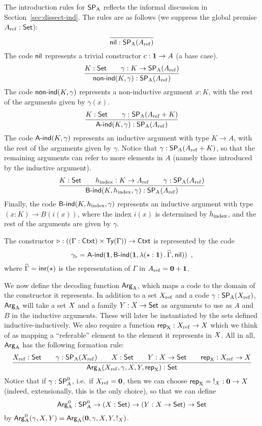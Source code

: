 \documentclass{article}
\begin{document}
The introduction rules for $\mathsf{SP}_{\mathrm{A}}$ reflects the informal discussion in
Section~\ref{sec:dissect-ind}. The rules are as follows (we suppress
the global premise $A_{\mathrm{ref}} : \mathsf{Set}$):
\[
\infer{\nilA : \SPA(\Aref)}{}
\]
%
The code $\mathsf{nil}$ represents a trivial constructor $c : \mathbf{1} \to A$ (a base case).
%
\[
\infer{\nonindA(K, \gamma) : \SPA(\Aref)}{K : \Set & \quad \gamma : K \to \SPA(\Aref)}
\]
%
The code $\mathsf{non}\text{-}\mathsf{ind}(K, \gamma)$ represents a non-inductive argument $x
: K$, with the rest of the arguments given by $\gamma(x)$.
%
\[
\infer{\AindA(K, \gamma) : \SPA(\Aref)}{K : \Set & \quad \gamma : \SPA(\Aref + K)}
\]
%
The code $\mathsf{A}\text{-}\mathsf{ind}(K, \gamma)$ represents an inductive argument with
type $K \to A$, with the rest of the arguments given by
$\gamma$. Notice that $\gamma : \mathsf{SP}_{\mathrm{A}}(A_{\mathrm{ref}} + K)$, so that the
remaining arguments can refer to more elements in $A$ (namely those
introduced by the inductive argument).
%
\[
\infer{\BindA(K, \hindex, \gamma) : \SPA(\Aref)}{K : \Set & \quad \hindex : K \to \Aref & \quad \gamma : \SPA(\Aref)}
\]
%
Finally, the code $\mathsf{B}\text{-}\mathsf{ind}(K, h_{\mathrm{index}}, \gamma)$ represents an inductive
argument with type $(x : K) \to B(i(x))$, where the index $i(x)$ is
determined by $h_{\mathrm{index}}$, and the rest of the arguments are given by
$\gamma$.
%

\begin{example}
  The constructor $\triangleright : ((\Gamma : \mathsf{Ctxt}) \times \mathsf{Ty}(\Gamma))
  \to \mathsf{Ctxt}$ is represented by the code
\[
\gamma_{\triangleright} = \mathsf{A}\text{-}\mathsf{ind}(\mathbf{1}, \mathsf{B}\text{-}\mathsf{ind}(\mathbf{1}, \lambda (\star : \mathbf{1})\,.\,\widehat{\Gamma}, \mathsf{nil})) \enspace ,
\]
where $\widehat{\Gamma} = \mathsf{inr}(\star)$ is the representation of $\Gamma$ in $A_{\mathrm{ref}} = \mathbf{0} + \mathbf{1}$.
\blackqed
\end{example}

We now define the decoding function $\mathsf{Arg}_{\mathrm{A}}$, which maps a code to the
domain of the constructor it represents. In addition to a set $X_{\mathrm{ref}}$
and a code $\gamma : \mathsf{SP}_{\mathrm{A}}(X_{\mathrm{ref}})$, $\mathsf{Arg}_{\mathrm{A}}$ will take a set $X$ and a
family $Y : X \to \mathsf{Set}$ as arguments to use as $A$ and $B$ in the
inductive arguments. These will later be instantiated by the sets
defined inductive-inductively. We also require a function $\mathsf{rep}_{\mathrm{X}} :
X_{\mathrm{ref}} \to X$ which we think of as mapping a ``referable'' element to
the element it represents in $X$. All in all, $\mathsf{Arg}_{\mathrm{A}}$ has the
following formation rule:
%
\[
\infer{\ArgA(\Xref, \gamma, \A, \B, \repA) : \Set}{\Xref : \Set
                                         & \quad \gamma : \SPA(\Xref)
                                         & \quad \A : \Set
                                         & \quad \B : \A \to \Set
                                         & \quad \repA : \Xref \to \A}
\]
%
Notice that if $\gamma : \mathsf{SP}^{0}_{\mathrm{A}}$, i.e.\ if $X_{\mathrm{ref}} = \mathbf{0}$, then we can
choose $\mathsf{rep}_{\mathrm{X}} = {} !_{X} : \mathbf{0} \to X$ (indeed, extensionally,
this is the only choice), so that we can define
\[
\mathsf{Arg}^{0}_{\mathrm{A}} : \mathsf{SP}^{0}_{\mathrm{A}} \to (X : \mathsf{Set}) \to (Y : X \to \mathsf{Set}) \to \mathsf{Set}
\]
by $\mathsf{Arg}^{0}_{\mathrm{A}}(\gamma, X, Y) = \mathsf{Arg}_{\mathrm{A}}(\mathbf{0}, \gamma, X, Y, !_{X})$.
\end{document}
